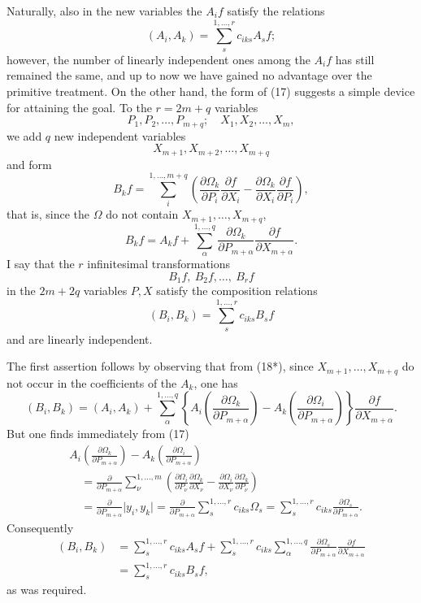\documentclass[11pt]{book}
\begin{document}
Naturally, also in the new variables the $A_i f$ satisfy the relations
\[
 (A_i,A_k)=\sum\limits_s^{1,\ldots,r} c_{iks}A_s f;
\]
however, the number of linearly independent ones among the $A_i f$ has still remained the same, and up to now we have gained no advantage over the primitive treatment. On the other hand, the form of (17) suggests a simple device for attaining the goal. To the $r=2m+q$ variables
\[
 P_1,P_2,\ldots,P_{m+q};\quad X_1,X_2,\ldots,X_m,
\]
we add $q$ new independent variables
\[
 X_{m+1},X_{m+2},\ldots,X_{m+q}
\]
and form
\begin{equation*}\tag{18}
 B_k f=\sum\limits_i^{1,\ldots,m+q}
 \left(
  \frac{\partial\Omega_k}{\partial P_i}\frac{\partial f}{\partial X_i}
 -\frac{\partial\Omega_k}{\partial X_i}\frac{\partial f}{\partial P_i}
 \right),
\end{equation*}
that is, since the $\Omega$ do not contain $X_{m+1},\ldots,X_{m+q}$,
\begin{equation*}\tag{18*}
 B_k f=A_k f+\sum\limits_{\alpha}^{1,\ldots,q}
 \frac{\partial\Omega_k}{\partial P_{m+\alpha}}
 \frac{\partial f}{\partial X_{m+\alpha}}.
\end{equation*}
I say that the $r$ infinitesimal transformations
\[
 B_1f,\ B_2f,\ldots,\ B_rf
\]
in the $2m+2q$ variables $P,X$ satisfy the composition relations
\[
 (B_i,B_k)=\sum\limits_s^{1,\ldots,r} c_{iks}B_sf
\]
and are linearly independent.

The first assertion follows by observing that from (18*), since $X_{m+1},\ldots,X_{m+q}$ do not occur in the coefficients of the $A_k$, one has
\[
 (B_i,B_k)=(A_i,A_k)+\sum\limits_{\alpha}^{1,\ldots,q}
 \left\{A_i\left(\frac{\partial\Omega_k}{\partial P_{m+\alpha}}\right)
       -A_k\left(\frac{\partial\Omega_i}{\partial P_{m+\alpha}}\right)
 \right\}
 \frac{\partial f}{\partial X_{m+\alpha}}.
\]
But one finds immediately from (17)
\[
\begin{split}
&A_i\left(\frac{\partial\Omega_k}{\partial P_{m+\alpha}}\right)
 -A_k\left(\frac{\partial\Omega_i}{\partial P_{m+\alpha}}\right)       \\
&\quad=\frac{\partial}{\partial P_{m+\alpha}}
 \sum\limits_{\nu}^{1,\ldots,m}
 \left(
  \frac{\partial\Omega_i}{\partial P_\nu}
  \frac{\partial\Omega_k}{\partial X_\nu}
 -\frac{\partial\Omega_i}{\partial X_\nu}
  \frac{\partial\Omega_k}{\partial P_\nu}
 \right)                                                   \\
&\quad=\frac{\partial}{\partial P_{m+\alpha}}\lvert y_i,y_k\rvert
 =\frac{\partial}{\partial P_{m+\alpha}}\sum\limits_s^{1,\ldots,r}c_{iks}\Omega_s
 =\sum\limits_s^{1,\ldots,r} c_{iks}\frac{\partial\Omega_s}{\partial P_{m+\alpha}}.
\end{split}
\]
Consequently
\[
\begin{split}
 (B_i,B_k)&=\sum\limits_s^{1,\ldots,r}c_{iks}A_s f
 +\sum\limits_s^{1,\ldots,r}c_{iks}\sum\limits_{\alpha}^{1,\ldots,q}
 \frac{\partial\Omega_s}{\partial P_{m+\alpha}}
 \frac{\partial f}{\partial X_{m+\alpha}}                 \\
 &=\sum\limits_s^{1,\ldots,r}c_{iks}B_s f,
\end{split}
\]
as was required.
\end{document}
